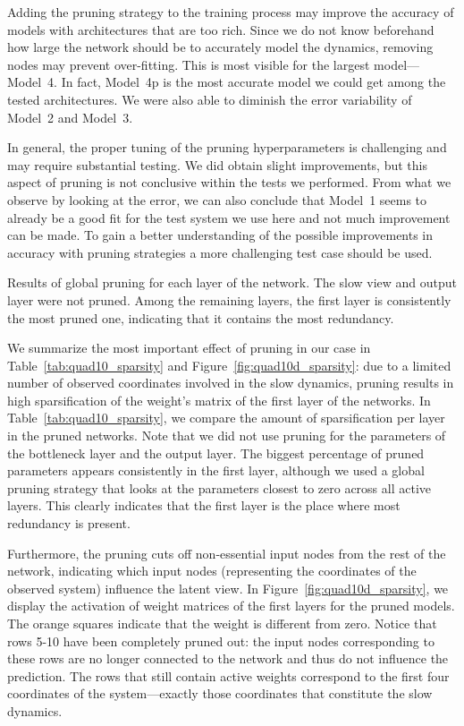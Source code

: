 \documentclass{article}
\begin{document}
Adding the pruning strategy to the training process may improve the accuracy of models with architectures that are too rich. Since we do not know beforehand how large the network should be to accurately model the dynamics, removing nodes may prevent over-fitting. This is most visible for the largest model---Model~4. In fact, Model~4p is the most accurate model we could get among the tested architectures. We were also able to diminish the error variability of Model~2 and Model~3.

In general, the proper tuning of the pruning hyperparameters is challenging and may require substantial testing. We did obtain slight improvements, but this aspect of pruning is not conclusive within the tests we performed. From what we observe by looking at the error, we can also conclude that Model~1 seems to already be a good fit for the test system we use here and not much improvement can be made. To gain a better understanding of the possible improvements in accuracy with pruning strategies a more challenging test case should be used. 

\begin{table}
    \centering
    \medskip

    \caption{Results of global pruning for each layer of the network. The slow view and output layer were not pruned. Among the remaining layers, the first layer is consistently the most pruned one, indicating that it contains the most redundancy.}
    \label{tab:quad10_sparsity}
\end{table}

We summarize the most important effect of pruning in our case in Table~\ref{tab:quad10_sparsity} and Figure~\ref{fig:quad10d_sparsity}: due to a limited number of observed coordinates involved in the slow dynamics, pruning results in high sparsification of the weight's matrix of the first layer of the networks. In Table~\ref{tab:quad10_sparsity}, we compare the amount of sparsification per layer in the pruned networks. Note that we did not use pruning for the parameters of the bottleneck layer and the output layer. The biggest percentage of pruned parameters appears consistently in the first layer, although we used a global pruning strategy that looks at the parameters closest to zero across all active layers. This clearly indicates that the first layer is the place where most redundancy is present.

Furthermore, the pruning cuts off non-essential input nodes from the rest of the network, indicating which input nodes (representing the coordinates of the observed system) influence the latent view. In Figure~\ref{fig:quad10d_sparsity}, we display the activation of weight matrices of the first layers for the pruned models. The orange squares indicate that the weight is different from zero. Notice that rows 5-10 have been completely pruned out: the input nodes corresponding to these rows are no longer connected to the network and thus do not influence the prediction. The rows that still contain active weights correspond to the first four coordinates of the system---exactly those coordinates that constitute the slow dynamics.
\end{document}
